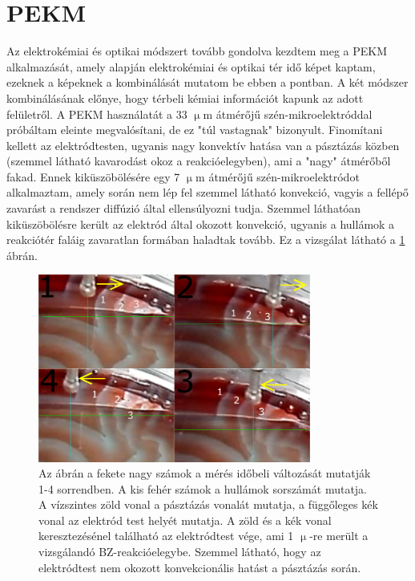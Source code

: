 \section{PEKM}
Az elektrokémiai és optikai módszert tovább gondolva kezdtem meg a PEKM alkalmazását, amely alapján elektrokémiai és optikai tér idő képet kaptam, ezeknek a képeknek a kombinálását mutatom be ebben a pontban. A két módszer kombinálásának előnye, hogy térbeli kémiai információt kapunk az adott felületről.
A PEKM használatát a 33 $\upmu$m átmérőjű szén-mikroelektróddal próbáltam eleinte megvalósítani, de ez "túl vastagnak" bizonyult. Finomítani kellett az elektródtesten, ugyanis nagy konvektív hatása van a pásztázás közben (szemmel látható kavarodást okoz a reakcióelegyben), ami a "nagy" átmérőből fakad. Ennek kiküszöbölésére egy 7 $\upmu$m átmérőjű szén-mikroelektródot alkalmaztam, amely során nem lép fel szemmel látható konvekció, vagyis a fellépő zavarást a rendszer diffúzió által ellensúlyozni tudja. Szemmel láthatóan kiküszöbölésre került az elektród által okozott konvekció, ugyanis a hullámok a reakciótér faláig zavaratlan formában haladtak tovább. Ez a  vizsgálat látható a \ref{fig:secmkep} ábrán.
\begin{figure}
\centering
\includegraphics[width=0.8\textwidth]{img/secmkep.png}
\caption{Az ábrán a fekete nagy számok a mérés időbeli változását mutatják 1-4 sorrendben. A kis fehér számok a hullámok sorszámát mutatja. A vízszintes zöld vonal a pásztázás vonalát mutatja, a függőleges kék vonal az elektród test helyét mutatja. A zöld és a kék vonal keresztezésénel található az elektródtest vége, ami 1 $\upmu$-re merült a vizsgálandó BZ-reakcióelegybe. Szemmel látható, hogy az elektródtest nem okozott konvekcionális hatást a pásztázás során.}
\label{fig:secmkep}
\end{figure}
